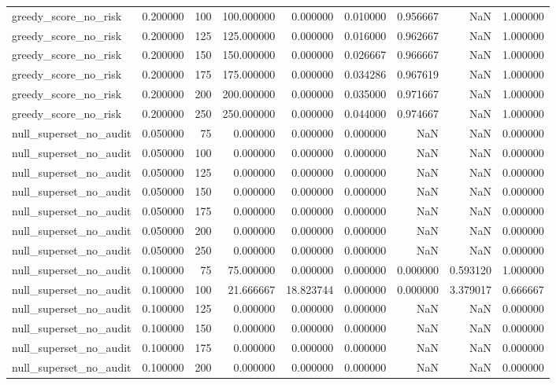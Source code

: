 \begin{tabular}{lrrrrrrrr}
greedy_score_no_risk & 0.200000 & 100 & 100.000000 & 0.000000 & 0.010000 & 0.956667 & NaN & 1.000000 \\
greedy_score_no_risk & 0.200000 & 125 & 125.000000 & 0.000000 & 0.016000 & 0.962667 & NaN & 1.000000 \\
greedy_score_no_risk & 0.200000 & 150 & 150.000000 & 0.000000 & 0.026667 & 0.966667 & NaN & 1.000000 \\
greedy_score_no_risk & 0.200000 & 175 & 175.000000 & 0.000000 & 0.034286 & 0.967619 & NaN & 1.000000 \\
greedy_score_no_risk & 0.200000 & 200 & 200.000000 & 0.000000 & 0.035000 & 0.971667 & NaN & 1.000000 \\
greedy_score_no_risk & 0.200000 & 250 & 250.000000 & 0.000000 & 0.044000 & 0.974667 & NaN & 1.000000 \\
null_superset_no_audit & 0.050000 & 75 & 0.000000 & 0.000000 & 0.000000 & NaN & NaN & 0.000000 \\
null_superset_no_audit & 0.050000 & 100 & 0.000000 & 0.000000 & 0.000000 & NaN & NaN & 0.000000 \\
null_superset_no_audit & 0.050000 & 125 & 0.000000 & 0.000000 & 0.000000 & NaN & NaN & 0.000000 \\
null_superset_no_audit & 0.050000 & 150 & 0.000000 & 0.000000 & 0.000000 & NaN & NaN & 0.000000 \\
null_superset_no_audit & 0.050000 & 175 & 0.000000 & 0.000000 & 0.000000 & NaN & NaN & 0.000000 \\
null_superset_no_audit & 0.050000 & 200 & 0.000000 & 0.000000 & 0.000000 & NaN & NaN & 0.000000 \\
null_superset_no_audit & 0.050000 & 250 & 0.000000 & 0.000000 & 0.000000 & NaN & NaN & 0.000000 \\
null_superset_no_audit & 0.100000 & 75 & 75.000000 & 0.000000 & 0.000000 & 0.000000 & 0.593120 & 1.000000 \\
null_superset_no_audit & 0.100000 & 100 & 21.666667 & 18.823744 & 0.000000 & 0.000000 & 3.379017 & 0.666667 \\
null_superset_no_audit & 0.100000 & 125 & 0.000000 & 0.000000 & 0.000000 & NaN & NaN & 0.000000 \\
null_superset_no_audit & 0.100000 & 150 & 0.000000 & 0.000000 & 0.000000 & NaN & NaN & 0.000000 \\
null_superset_no_audit & 0.100000 & 175 & 0.000000 & 0.000000 & 0.000000 & NaN & NaN & 0.000000 \\
null_superset_no_audit & 0.100000 & 200 & 0.000000 & 0.000000 & 0.000000 & NaN & NaN & 0.000000 \\

\end{tabular}

